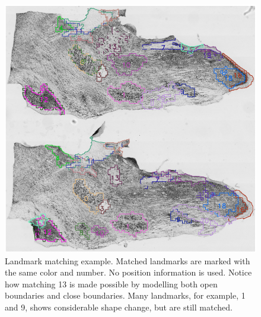 \documentclass{llncs}
\begin{document}
\begin{figure}
	\includegraphics[width=\textwidth]{../figures/MatchedLMs_0006_0007.png}
	\caption{Landmark matching example. Matched landmarks are marked with the same color and number. No position information is used. Notice how matching 13 is made possible by modelling both open boundaries and close boundaries. Many landmarks, for example, 1 and 9, shows considerable shape change, but are still matched.}
	\label{fig:LandmarkMatch}
\end{figure}
\end{document}
